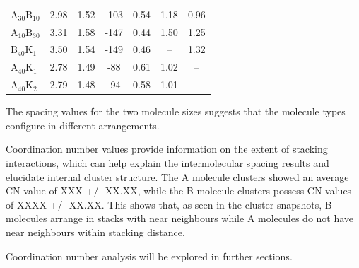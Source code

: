 \begin{table}[ht]
\begin{tabular}{lcccccc}
$\text{A}_{\text{30}}\text{B}_{\text{10}}$ & 2.98 & 1.52 & -103 & 0.54 &  \multicolumn{1}{c}{1.18} & 0.96 \\
$\text{A}_{\text{10}}\text{B}_{\text{30}}$ & 3.31 & 1.58 & -147 & 0.44 &  \multicolumn{1}{c}{1.50} & 1.25 \\ \hline
$\text{B}_{\text{40}}\text{K}_{\text{1}}$ & 3.50 & 1.54 & -149 & 0.46 &  \multicolumn{1}{c}{--} & 1.32 \\
$\text{A}_{\text{40}}\text{K}_{\text{1}}$ & 2.78 & 1.49 & -88 & 0.61 &  \multicolumn{1}{c}{1.02} & -- \\
$\text{A}_{\text{40}}\text{K}_{\text{2}}$ & 2.79 & 1.48 & -94 & 0.58 &  \multicolumn{1}{c}{1.01} & -- \\ \hline
\end{tabular}
\end{table}
%



The spacing values for the two molecule sizes suggests that the molecule types configure in different arrangements. 

Coordination number values provide information on the extent of stacking interactions, which can help explain the intermolecular spacing results and elucidate internal cluster structure. The A molecule clusters showed an average CN value of XXX +/- XX.XX, while the B molecule clusters possess CN values of XXXX +/- XX.XX.  This shows that, as seen in the cluster snapshots, B molecules arrange in stacks with near neighbours while A molecules do not have near neighbours within stacking distance.

Coordination number analysis will be explored in further sections.


